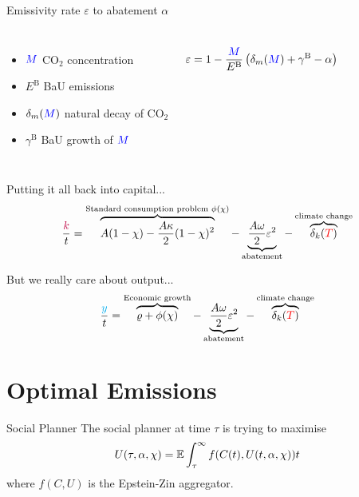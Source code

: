 \documentclass[pdf]{beamer}
\let\d\relax
\newcommand{\d}[1]{\mathrm{d}#1}
\begin{document}
\begin{frame}{Emissivity rate $\varepsilon$ to abatement $\alpha$}
    \begin{columns}
        \begin{itemize}
            \item ${\color{blue} M}$ CO$_2$ concentration
            \item $E^{\mathrm{B}}$ BaU emissions
            \item $\delta_m({\color{blue} M})$ natural decay of CO$_2$
            \item $\gamma^{\mathrm{B}}$ BaU growth of ${\color{blue} M}$
        \end{itemize}
        \begin{equation*}
            \varepsilon = 1 - \frac{{\color{blue} M}}{ E^{\mathrm{B}}} \left( \delta_m({\color{blue} M}) + \gamma^{\mathrm{B}} - \mathbf{\alpha} \right)
        \end{equation*}
    \end{columns}
\end{frame}


\begin{frame}{Putting it all back into capital...}
    \begin{equation*}
        \frac{\d {{\color{purple} k}}}{\d t} = \overbrace{A (1 - \mathbf{\chi}) - \frac{A\kappa}{2} (1 - \mathbf{\chi})^2}^{\text{Standard consumption problem $\phi(\chi)$}} - \underbrace{\frac{A \omega}{2} \mathbf{\varepsilon}^2}_{\text{abatement}} - \overbrace{\delta_k({\color{red} T})}^{\text{climate change}}
    \end{equation*}
\end{frame}


\begin{frame}{But we really care about output...}
    \begin{equation*}
        \frac{\d {{\color{cyan} y}}}{\d t} = \overbrace{\varrho + \phi(\chi)}^{\text{Economic growth}} - \underbrace{\frac{A \omega}{2} \mathbf{\varepsilon}^2}_{\text{abatement}} - \overbrace{\delta_k({\color{red} T})}^{\text{climate change}}
    \end{equation*}
\end{frame}

\section{Optimal Emissions}

\begin{frame}{Social Planner}
    The social planner at time $\tau$ is trying to maximise \begin{equation*}
        U(\tau, \alpha, \chi) = \mathbb{E} \int^\infty_\tau f(C(t), U(t, \alpha, \chi)) \d t
    \end{equation*} where $f(C, U)$ is the Epstein-Zin aggregator.
\end{frame}
\end{document}
